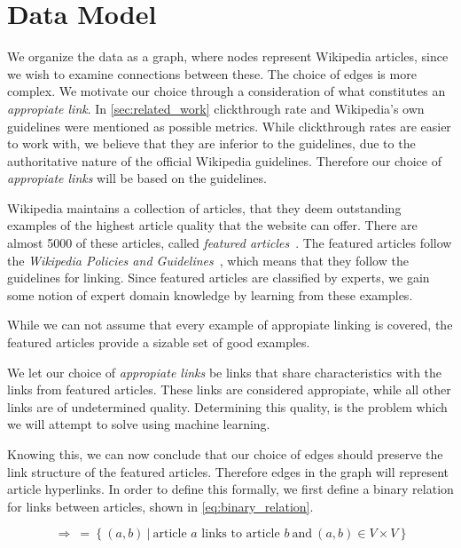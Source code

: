 \section{Data Model}\label{sec:choice_of_graph}
We organize the data as a graph, where nodes represent Wikipedia articles, since we wish to examine connections between these. The choice of edges is more complex. We motivate our choice through a consideration of what constitutes an \emph{appropiate link}. In \cref{sec:related_work} clickthrough rate and Wikipedia's own guidelines were mentioned as possible metrics. While clickthrough rates are easier to work with, we believe that they are inferior to the guidelines, due to the authoritative nature of the official Wikipedia guidelines. Therefore our choice of \emph{appropiate links} will be based on the guidelines.

Wikipedia maintains a collection of articles, that they deem outstanding examples of the highest article quality that the website can offer. There are almost 5000 of these articles, called \emph{featured articles}~\cite{wiki-featured-articles}. The featured articles follow the \emph{Wikipedia Policies and Guidelines}~\cite{wiki-editor-guidelines}, which means that they follow the guidelines for linking. Since featured articles are classified by experts, we gain some notion of expert domain knowledge by learning from these examples.

While we can not assume that every example of appropiate linking is covered, the featured articles provide a sizable set of good examples. 

We let our choice of \emph{appropiate links} be links that share characteristics with the links from featured articles. These links are considered appropiate, while all other links are of undetermined quality. Determining this quality, is the problem which we will attempt to solve using machine learning. 

Knowing this, we can now conclude that our choice of edges should preserve the link structure of the featured articles. Therefore edges in the graph will represent article hyperlinks. In order to define this formally, we first define a binary relation for links between articles, shown in \cref{eq:binary_relation}.  

\begin{equation}
\label{eq:binary_relation}
\Rightarrow\ =\ \{\ (a,b)\ |\ \text{article } a \text{ links to article } b\ \text{and}\ (a,b) \in V \times V\ \}
\end{equation}

